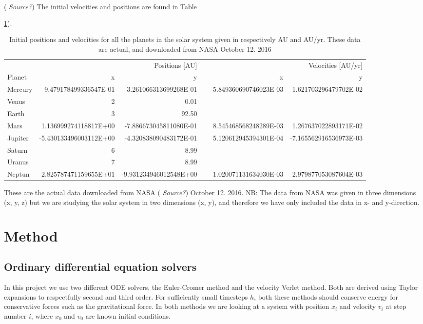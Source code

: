 \documentclass[norsk,a4paper,12pt]{article}
\begin{document}
(\emph{\color{red} Source?}) The initial velocities and positions are found in Table {\ref{table:Positions}).
\begin{table}[H]
\centering
\label{table:Positions}
\caption{Initial positions and velocities for all the planets in the solar system given in respectively AU and AU/yr. These data are actual, and downloaded from NASA October 12. 2016}
\begin{tabular}{lrrrrr}
\hline
\multicolumn{3}{r}{Positions [AU]} & \multicolumn{3}{r}{Velocities [AU/yr]} \\
\cline{2-3}
\cline{5-6}
Planet           & x & y &  & x & y \\
\hline
Mercury      & 9.479178499336547E-01 & 3.261066313699268E-01 & & -5.849360690746023E-03 &1.621703296479702E-02\\
Venus        & 2        & 0.01       \\
Earth        & 3     & 92.50      \\
Mars         & 1.136999274118817E+00     & -7.886673045811080E-01 & & 8.545468568248289E-03 & 1.267637022893171E-02      \\
Jupiter      & -5.430133496003112E+00    & -4.320838090483172E-01 & & 5.120612945394301E-04 & -7.165562916536973E-03    \\
Saturn       & 6      & 8.99       \\
Uranus 		 & 7      & 8.99       \\
Neptun 		 & 2.825787471159655E+01      & -9.931234946012548E+00 & & 1.020071131634030E-03 & 2.979877053087604E-03       \\
\hline
\end{tabular}
\end{table}
These are the actual data downloaded from NASA (\emph{\color{red} Source?}) October 12. 2016. NB: The data from NASA was given in three dimensions (x, y, z) but we are studying the solar system in two dimensions (x, y), and therefore we have only included the data in x- and y-direction.\par\vspace{3mm}


\section{Method}
\subsection{Ordinary differential equation solvers}
In this project we use two different ODE solvers, the Euler-Cromer method and the velocity Verlet method. Both are derived using Taylor expansions to respectfully second and third order. For sufficiently small timesteps $h$, both these methods should conserve energy for conservative forces such as the gravitational force. In both methods we are looking at a system with position $x_i$ and velocity $v_i$ at step number $i$, where $x_0$ and $v_0$ are known initial conditions.
}
\end{document}
